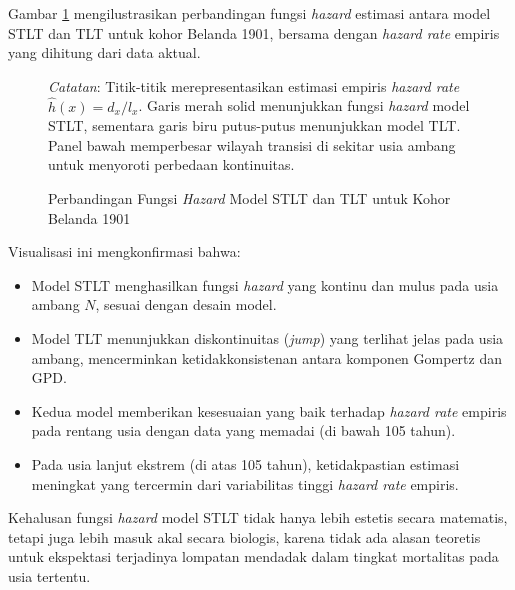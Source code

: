 Gambar \ref{fig:stlt_hazard_comparison} mengilustrasikan perbandingan fungsi \textit{hazard} estimasi antara model STLT dan TLT untuk kohor Belanda 1901, bersama dengan \textit{hazard rate} empiris yang dihitung dari data aktual.

\begin{figure}[htbp]
\centering
\caption{Perbandingan Fungsi \textit{Hazard} Model STLT dan TLT untuk Kohor Belanda 1901}
\label{fig:stlt_hazard_comparison}
\begin{fignotes}
\small
\item \textit{Catatan}: Titik-titik merepresentasikan estimasi empiris \textit{hazard rate} $\hat{h}(x) = d_x/l_x$. Garis merah solid menunjukkan fungsi \textit{hazard} model STLT, sementara garis biru putus-putus menunjukkan model TLT. Panel bawah memperbesar wilayah transisi di sekitar usia ambang untuk menyoroti perbedaan kontinuitas.
\end{fignotes}
\end{figure}

Visualisasi ini mengkonfirmasi bahwa:
\begin{itemize}
    \item Model STLT menghasilkan fungsi \textit{hazard} yang kontinu dan mulus pada usia ambang $N$, sesuai dengan desain model.
    \item Model TLT menunjukkan diskontinuitas (\textit{jump}) yang terlihat jelas pada usia ambang, mencerminkan ketidakkonsistenan antara komponen Gompertz dan GPD.
    \item Kedua model memberikan kesesuaian yang baik terhadap \textit{hazard rate} empiris pada rentang usia dengan data yang memadai (di bawah 105 tahun).
    \item Pada usia lanjut ekstrem (di atas 105 tahun), ketidakpastian estimasi meningkat yang tercermin dari variabilitas tinggi \textit{hazard rate} empiris.
\end{itemize}

Kehalusan fungsi \textit{hazard} model STLT tidak hanya lebih estetis secara matematis, tetapi juga lebih masuk akal secara biologis, karena tidak ada alasan teoretis untuk ekspektasi terjadinya lompatan mendadak dalam tingkat mortalitas pada usia tertentu.

